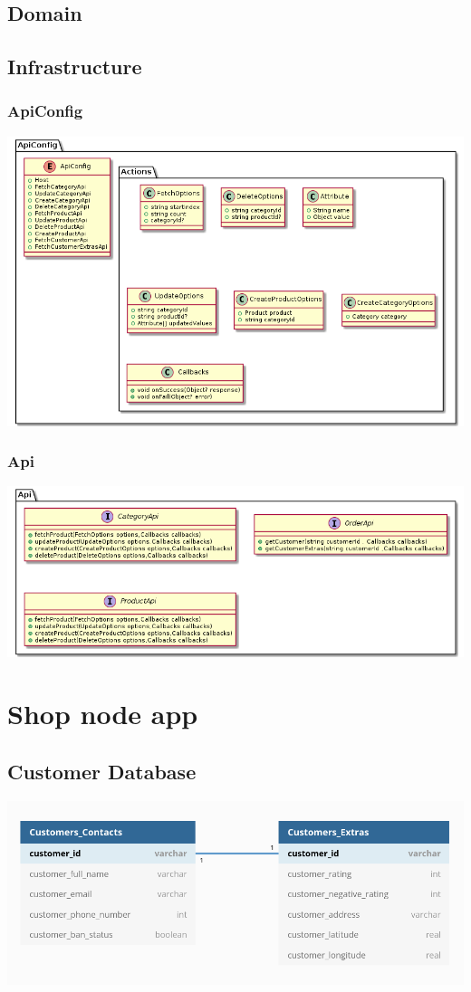 \documentclass{article}
\begin{document}
\subsection{Domain}
\subsection{Infrastructure}
\subsubsection{ApiConfig}
\includegraphics[scale=0.5]{./out/ReactApp/Infrastructure/ApiConfig/ApiConfig.png}
\subsubsection{Api}
\includegraphics[scale=0.5]{./out/ReactApp/Infrastructure/Api/Api.png}
\section{Shop node app}
\subsection{Customer Database}
\includegraphics[scale=0.3]{./out/NodeApp/Database/CustomersTable.png}\newline
\end{document}
